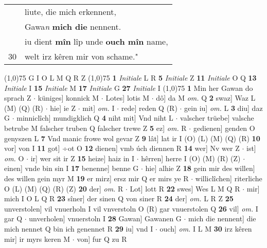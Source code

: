 \documentclass[8pt,a4paper,notitlepage]{article}
\begin{document}
\begin{table}[ht]
\begin{minipage}[t]{0.5\linewidth}
\begin{tabular}{rl}
 & liute, die mich erkennent,\\ 
 & Gawa\textit{n} \textbf{mich die} nennent.\\ 
 & iu dient \textbf{mîn} lîp unde \textbf{ouch mîn} name,\\ 
30 & welt irz kêren mir von schame."\\ 
\end{tabular}
\scriptsize
\line(1,0){75} \newline
G I O L M Q R Z \newline
\line(1,0){75} \newline
\textbf{1} \textit{Initiale} L R  \textbf{5} \textit{Initiale} Z  \textbf{11} \textit{Initiale} O Q  \textbf{13} \textit{Initiale} I  \textbf{15} \textit{Initiale} M  \textbf{17} \textit{Initiale} G  \textbf{27} \textit{Initiale} I  \newline
\line(1,0){75} \newline
\textbf{1} Min her Gawan do sprach Z  $\cdot$ küniges] konnick M  $\cdot$ Lotes] lotis M  $\cdot$ dô] da M \textit{om.} Q \textbf{2} swaz] Waz L (M) (Q) (R)  $\cdot$ hie] ie Z  $\cdot$ mit] \textit{om.} I  $\cdot$ rede] reden Q (R)  $\cdot$ gein iu] \textit{om.} L \textbf{3} diu] daz G  $\cdot$ minniclîch] mundigklich Q \textbf{4} niht mit] Vnd niht L  $\cdot$ valscher trüebe] valsche betrube M falscher truben Q falscher trewe Z \textbf{5} ez] \textit{om.} R  $\cdot$ gedienen] genden O genyszen L \textbf{7} Vnd manic frowe wol gevar Z \textbf{9} lât] lat ir I (O) (L) (M) (Q) (R) \textbf{10} vor] von I \textbf{11} got] ÷ot O \textbf{12} dienen] vmb úch diennen R \textbf{14} wer] Nv wer Z  $\cdot$ ist] \textit{om.} O  $\cdot$ ir] wer sit ir Z \textbf{15} heize] haiz in I  $\cdot$ hêrren] herre I (O) (M) (R) (Z)  $\cdot$ einen] vnde bin sin I \textbf{17} benenne] benne G  $\cdot$ hie] alhie Z \textbf{18} gein mir des willen] des willen gein myr M \textbf{19} er mirz] ersz mir Q er mirs ye R  $\cdot$ williclîchen] riterliche O (L) (M) (Q) (R) (Z) \textbf{20} der] \textit{om.} R  $\cdot$ Lot] lott R \textbf{22} swes] Wes L M Q R  $\cdot$ mir] mich I O L Q R \textbf{23} sîner] der sinen Q von siner R \textbf{24} der] \textit{om.} L R Z \textbf{25} unverstolen] vil vnuerholn I vil vnverstoln O (R) gar vnuerstolen Q \textbf{26} vil] \textit{om.} I gar Q  $\cdot$ unverholen] vnuerstoln I \textbf{28} Gawan] Gawanen G  $\cdot$ mich die nennent] die mich nennet Q bin ich genennet R \textbf{29} iu] vnd I  $\cdot$ ouch] \textit{om.} I L M \textbf{30} irz kêren mir] ir myrs keren M  $\cdot$ von] fur Q zu R \newline

\end{minipage}
\end{table}
\end{document}

